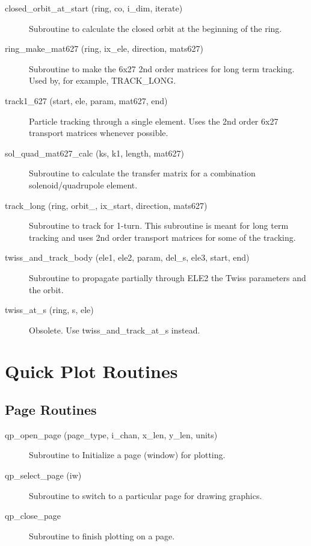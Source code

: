 \begin{description}

\item[closed\_orbit\_at\_start (ring, co, i\_dim, iterate)] \Newline
Subroutine to calculate the closed orbit at the beginning of the ring. 

\item[ring\_make\_mat627 (ring, ix\_ele, direction, mats627)] \Newline
Subroutine to make the 6x27 2nd order matrices for long term tracking. 
Used by, for example, TRACK\_LONG. 

\item[track1\_627 (start, ele, param, mat627, end)] \Newline
Particle tracking through a single element. Uses the 2nd order 6x27 transport 
matrices whenever possible. 

\item[sol\_quad\_mat627\_calc (ks, k1, length, mat627)] \Newline
Subroutine to calculate the transfer matrix for a combination solenoid/quadrupole element. 

\item[track\_long (ring, orbit\_, ix\_start, direction, mats627)] \Newline
Subroutine to track for 1-turn. This subroutine is meant for long term tracking and 
uses 2nd order transport matrices for some of the tracking. 

\item[twiss\_and\_track\_body (ele1, ele2, param, del\_s, ele3, start, end)] \Newline
Subroutine to propagate partially through ELE2 the Twiss parameters and the orbit. 

\item[twiss\_at\_s (ring, s, ele)] \Newline
Obsolete. Use twiss\_and\_track\_at\_s instead. 

\end{description}

\section{Quick Plot Routines}
\label{r:qp}      


\subsection{Page Routines}

\begin{description}

\item[qp\_open\_page (page\_type, i\_chan, x\_len, y\_len, units)] \Newline 
     Subroutine to Initialize a page (window) for plotting.

\item[qp\_select\_page (iw)] \Newline 
     Subroutine to switch to a particular page for drawing graphics.

\item[qp\_close\_page] \Newline 
     Subroutine to finish plotting on a page.

\end{description}

